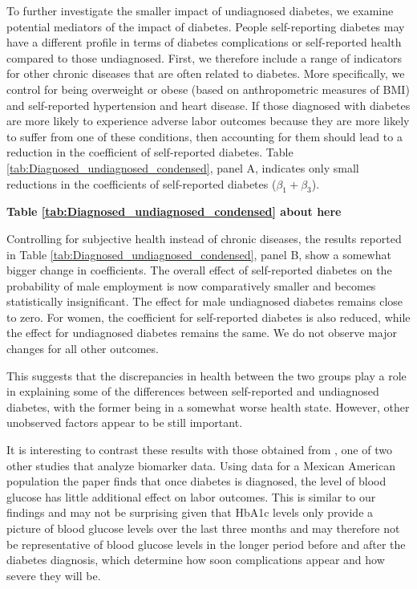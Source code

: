 \documentclass[12pt,english]{article}
\begin{document}
To further investigate the smaller impact of undiagnosed diabetes, we examine potential mediators of the impact of diabetes. People self-reporting diabetes may have a different profile in terms of diabetes complications or self-reported health compared to those undiagnosed. First, we therefore include a range of indicators for other chronic diseases that are often related to diabetes. More specifically, we control for being overweight or obese (based on anthropometric measures of \ac{BMI}) and self-reported hypertension and heart disease. If those diagnosed with diabetes are more likely to experience adverse labor outcomes because they are more likely to suffer from one of these conditions, then accounting for them should lead to a reduction in the coefficient of self-reported diabetes. Table \ref{tab:Diagnosed_undiagnosed_condensed}, panel A, indicates only small reductions in the coefficients of self-reported diabetes ($\beta_{1}+\beta_{3}$). 

\begin{center}
	\textbf{Table \ref{tab:Diagnosed_undiagnosed_condensed} about here}
\end{center}

Controlling for subjective health instead of chronic diseases, the results reported in Table \ref{tab:Diagnosed_undiagnosed_condensed}, panel B, show a somewhat bigger change in coefficients. The overall effect of self-reported diabetes on the probability of male employment is now comparatively smaller and becomes statistically insignificant. The effect for male undiagnosed diabetes remains close to zero. For women, the coefficient for self-reported diabetes is also reduced, while the effect for undiagnosed diabetes remains the same. We do not observe major changes for all other outcomes.   

This suggests that the  discrepancies in health between the two groups play a role in explaining some of the differences between self-reported and undiagnosed diabetes, with the former being in a somewhat worse health state. However, other unobserved factors appear to be still important.

It is interesting to contrast these results with those obtained from \textcite{BrownIII2011}, one of two other studies that analyze biomarker data. Using data for a Mexican American population the paper finds that once diabetes is diagnosed, the level of blood glucose has
little additional effect on labor outcomes. This is similar to our findings and may not be surprising given that HbA1c levels only provide a picture of blood glucose levels over the last three months and may therefore not be representative of blood glucose levels in the longer period
before and after the diabetes diagnosis, which determine how soon complications appear and how severe they will be.
\end{document}
